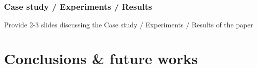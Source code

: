 \documentclass[handout]{beamer}\mode<handout>{\usetheme{AMSBolognaFC}}
\begin{document}
\begin{frame}%
\frametitle{Case study / Experiments / Results}

    Provide 2-3 slides discussing the Case study / Experiments / Results of the paper

\end{frame}

\section{Conclusions \& future works}
\end{document}
